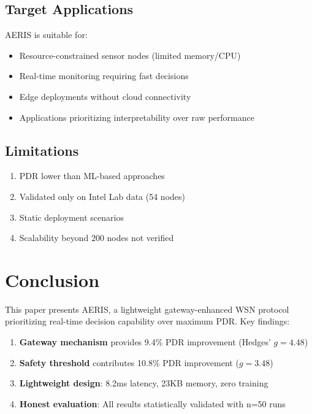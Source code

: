 \documentclass[11pt,a4paper]{article}
\begin{document}
\subsection{Target Applications}

AERIS is suitable for:
\begin{itemize}
    \item Resource-constrained sensor nodes (limited memory/CPU)
    \item Real-time monitoring requiring fast decisions
    \item Edge deployments without cloud connectivity
    \item Applications prioritizing interpretability over raw performance
\end{itemize}

\subsection{Limitations}

\begin{enumerate}
    \item PDR lower than ML-based approaches
    \item Validated only on Intel Lab data (54 nodes)
    \item Static deployment scenarios
    \item Scalability beyond 200 nodes not verified
\end{enumerate}

\section{Conclusion}

This paper presents AERIS, a lightweight gateway-enhanced WSN protocol prioritizing real-time decision capability over maximum PDR. Key findings:

\begin{enumerate}
    \item \textbf{Gateway mechanism} provides 9.4\% PDR improvement (Hedges' $g=4.48$)
    \item \textbf{Safety threshold} contributes 10.8\% PDR improvement ($g=3.48$)
    \item \textbf{Lightweight design}: 8.2ms latency, 23KB memory, zero training
    \item \textbf{Honest evaluation}: All results statistically validated with n=50 runs
\end{enumerate}
\end{document}
